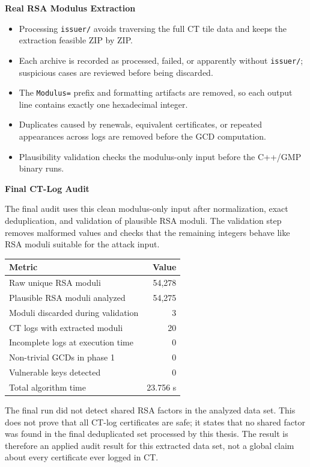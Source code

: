 \documentclass{article}
\newlength{\postercolwidth}
\newcommand{\smalltable}{\fontsize{22}{26}\selectfont}
\newenvironment{posterblock}[1]
{
  \vspace{1.0cm}
  \noindent
  \begin{minipage}{\postercolwidth}
  \colorbox{posterblue}{%
    \parbox{\dimexpr\postercolwidth-2\fboxsep\relax}{%
      \color{white}\bfseries\fontsize{32}{38}\selectfont #1
    }%
  }
  \par\vspace{0.22cm}
  \color{postergray}
  \fontsize{29}{35}\selectfont
}
{
  \end{minipage}
  \par
}
\begin{document}
\begin{minipage}[t]{\postercolwidth}
\begin{posterblock}{Real RSA Modulus Extraction}
\begin{itemize}
  \item Processing \texttt{issuer/} avoids traversing the full CT tile data and
  keeps the extraction feasible ZIP by ZIP.
  \item Each archive is recorded as processed, failed, or apparently without
  \texttt{issuer/}; suspicious cases are reviewed before being discarded.
  \item The \texttt{Modulus=} prefix and formatting artifacts are removed, so
  each output line contains exactly one hexadecimal integer.
  \item Duplicates caused by renewals, equivalent certificates, or repeated
  appearances across logs are removed before the GCD computation.
  \item Plausibility validation checks the modulus-only input before the
  C++/GMP binary runs.
\end{itemize}
\end{posterblock}

\begin{posterblock}{Final CT-Log Audit}
The final audit uses this clean modulus-only input after normalization, exact
deduplication, and validation of plausible RSA moduli. The validation step
removes malformed values and checks that the remaining integers behave like RSA
moduli suitable for the attack input.

{\smalltable
\begin{center}
\begin{tabular}{@{}p{16.2cm}r@{}}
\toprule
Metric & Value \\
\midrule
Raw unique RSA moduli & 54,278 \\
Plausible RSA moduli analyzed & 54,275 \\
Moduli discarded during validation & 3 \\
CT logs with extracted moduli & 20 \\
Incomplete logs at execution time & 0 \\
Non-trivial GCDs in phase 1 & 0 \\
Vulnerable keys detected & 0 \\
Total algorithm time & 23.756 s \\
\bottomrule
\end{tabular}
\end{center}
}

The final run did not detect shared RSA factors in the analyzed data set. This
does not prove that all CT-log certificates are safe; it states that no shared
factor was found in the final deduplicated set processed by this thesis. The
result is therefore an applied audit result for this extracted data set, not a
global claim about every certificate ever logged in CT.
\end{posterblock}


\end{minipage}
\end{document}
